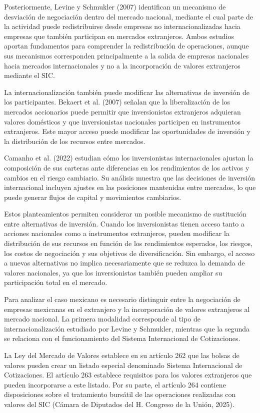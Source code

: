 Posteriormente, Levine y Schmukler (2007) identifican un mecanismo de desviación de negociación dentro del mercado nacional, mediante el cual parte de la actividad puede redistribuirse desde empresas no internacionalizadas hacia empresas que también participan en mercados extranjeros. Ambos estudios aportan fundamentos para comprender la redistribución de operaciones, aunque sus mecanismos corresponden principalmente a la salida de empresas nacionales hacia mercados internacionales y no a la incorporación de valores extranjeros mediante el SIC.

La internacionalización también puede modificar las alternativas de inversión de los participantes. Bekaert et al. (2007) señalan que la liberalización de los mercados accionarios puede permitir que inversionistas extranjeros adquieran valores domésticos y que inversionistas nacionales participen en instrumentos extranjeros. Este mayor acceso puede modificar las oportunidades de inversión y la distribución de los recursos entre mercados.

Camanho et al. (2022) estudian cómo los inversionistas internacionales ajustan la composición de sus carteras ante diferencias en los rendimientos de los activos y cambios en el riesgo cambiario. Su análisis muestra que las decisiones de inversión internacional incluyen ajustes en las posiciones mantenidas entre mercados, lo que puede generar flujos de capital y movimientos cambiarios.

Estos planteamientos permiten considerar un posible mecanismo de sustitución entre alternativas de inversión. Cuando los inversionistas tienen acceso tanto a acciones nacionales como a instrumentos extranjeros, pueden modificar la distribución de sus recursos en función de los rendimientos esperados, los riesgos, los costos de negociación y sus objetivos de diversificación. Sin embargo, el acceso a nuevas alternativas no implica necesariamente que se reduzca la demanda de valores nacionales, ya que los inversionistas también pueden ampliar su participación total en el mercado.

Para analizar el caso mexicano es necesario distinguir entre la negociación de empresas mexicanas en el extranjero y la incorporación de valores extranjeros al mercado nacional. La primera modalidad corresponde al tipo de internacionalización estudiado por Levine y Schmukler, mientras que la segunda se relaciona con el funcionamiento del Sistema Internacional de Cotizaciones.

La Ley del Mercado de Valores establece en su artículo 262 que las bolsas de valores pueden crear un listado especial denominado Sistema Internacional de Cotizaciones. El artículo 263 establece requisitos para los valores extranjeros que pueden incorporarse a este listado. Por su parte, el artículo 264 contiene disposiciones sobre el tratamiento bursátil de las operaciones realizadas con valores del SIC (Cámara de Diputados del H. Congreso de la Unión, 2025).

